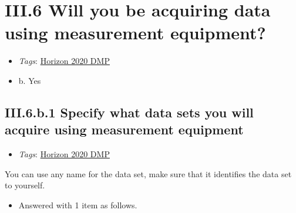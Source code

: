 \documentclass[a4paper,12pt]{report}
\begin{document}
\section*{\protect\textcolor{colorSecId}{III.6} Will you be acquiring data using measurement equipment?}

\label{b1df3c74-0b1f-4574-81c4-4cc2d780c1af.f87c331d-794a-42c8-a910-61a2a9110dab}


\begin{itemize}
  \item \textit{Tags}: \ul{Horizon 2020 DMP}
  \end{itemize}




\begin{itemize}
  \item[\CheckmarkBold] b. Yes
\end{itemize}




\subsection*{\protect\textcolor{colorSecId}{III.6.b.1} Specify what data sets you will acquire using measurement equipment}

\label{b1df3c74-0b1f-4574-81c4-4cc2d780c1af.f87c331d-794a-42c8-a910-61a2a9110dab.e4ca2d31-137a-46d3-96cd-3e9e8c5e9a76.f5fef09d-ade5-4019-b089-f05bd89c34bc}


\begin{itemize}
  \item \textit{Tags}: \ul{Horizon 2020 DMP}
  \end{itemize}


\noindent
\begin{markdown}
You can use any name for the data set, make sure that it identifies the data set to yourself.
\end{markdown}


\begin{itemize}
  \item[\ArrowBoldDownRight] Answered with 1 item as follows.
\end{itemize}%
\end{document}
